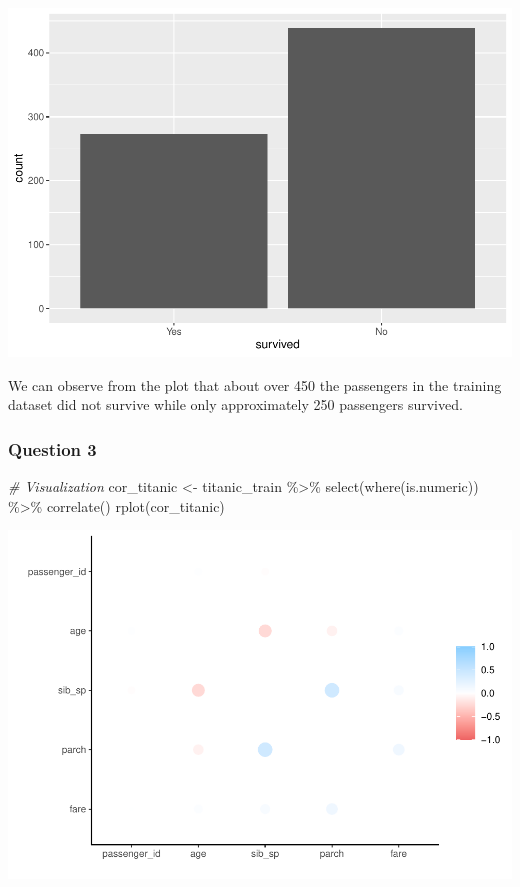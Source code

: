 \documentclass[
]{article}
\newenvironment{Shaded}{\begin{snugshade}}{\end{snugshade}}
\newcommand{\CommentTok}[1]{\textcolor[rgb]{0.56,0.35,0.01}{\textit{#1}}}
\newcommand{\FunctionTok}[1]{\textcolor[rgb]{0.00,0.00,0.00}{#1}}
\newcommand{\NormalTok}[1]{#1}
\newcommand{\OtherTok}[1]{\textcolor[rgb]{0.56,0.35,0.01}{#1}}
\newcommand{\SpecialCharTok}[1]{\textcolor[rgb]{0.00,0.00,0.00}{#1}}
\begin{document}
\includegraphics{hw3_files/figure-latex/unnamed-chunk-5-1.pdf}

We can observe from the plot that about over 450 the passengers in the
training dataset did not survive while only approximately 250 passengers
survived.

\hypertarget{question-3}{%
\subsubsection{Question 3}\label{question-3}}

\begin{Shaded}
\begin{Highlighting}[]
\CommentTok{\# Visualization}
\NormalTok{cor\_titanic }\OtherTok{\textless{}{-}}\NormalTok{ titanic\_train }\SpecialCharTok{\%\textgreater{}\%}
  \FunctionTok{select}\NormalTok{(}\FunctionTok{where}\NormalTok{(is.numeric)) }\SpecialCharTok{\%\textgreater{}\%}
  \FunctionTok{correlate}\NormalTok{()}
\FunctionTok{rplot}\NormalTok{(cor\_titanic)}
\end{Highlighting}
\end{Shaded}

\includegraphics{hw3_files/figure-latex/unnamed-chunk-6-1.pdf}
\end{document}
